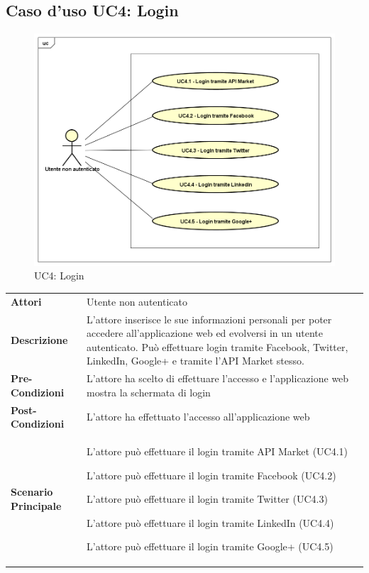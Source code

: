 \newpage
\subsection{Caso d'uso UC4: Login}
\label{UC4}
\begin{figure}[ht]
	\centering
	\includegraphics[scale=0.45]{UML/UC4.png}
	\caption{UC4: Login}
\end{figure}

\begin{longtable}{ l | p{11cm}}
	\hline
	\rowcolor{Gray}
	 \multicolumn{2}{c}{UC4 - Login}\\
	 \hline
	\textbf{Attori} & Utente non autenticato \\
	\textbf{Descrizione} & L'attore inserisce le sue informazioni personali per poter accedere all'applicazione web ed evolversi in un utente autenticato. Può effettuare login tramite Facebook, Twitter, LinkedIn, Google+ e tramite l'API Market stesso. \\
	\textbf{Pre-Condizioni} & L'attore ha scelto di effettuare l'accesso e l'applicazione web mostra la schermata di login \\
	\textbf{Post-Condizioni} & L'attore ha effettuato l'accesso all'applicazione web \\
	\textbf{Scenario Principale} & \begin{enumerate*}[label=(\arabic*.),itemjoin={\newline}]
		\item L'attore può effettuare il login tramite API Market (UC4.1)
		\item L'attore può effettuare il login tramite Facebook (UC4.2)
		\item L'attore può effettuare il login tramite Twitter (UC4.3)
		\item L'attore può effettuare il login tramite LinkedIn (UC4.4)
		\item L'attore può effettuare il login tramite Google+ (UC4.5)
	\end{enumerate*}\\
\end{longtable}
